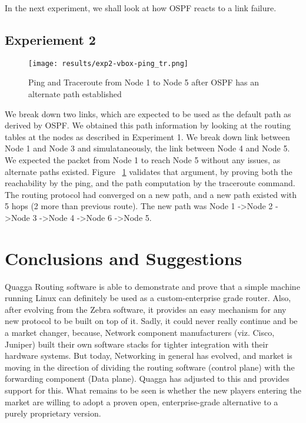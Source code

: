 \documentclass{article}
\begin{document}
In the next experiment, we shall look at how OSPF reacts to a link failure.\\
\subsection{Experiement 2}
\begin{figure}[ht!]
  \centering
  \texttt{[image: results/exp2-vbox-ping\_tr.png]}
  \caption{Ping and Traceroute from Node 1 to Node 5 after OSPF has an alternate path established}
  \label{fig:exp2-vbox-ping_tr}
\end{figure}
We break down two links, which are expected to be used as the default path as derived by OSPF.
We obtained this path information by looking at the routing tables at the nodes as described in 
Experiment 1. We break down link between Node 1 and Node 3 and simulataneously, the link between 
Node 4 and Node 5. We expected the packet from Node 1 to reach Node 5 without any issues, as 
alternate paths existed. Figure~ \ref{fig:exp2-vbox-ping_tr} validates that argument, by proving
both the reachability by the ping, and the path computation by the traceroute command.
The routing protocol had converged on a new path, and a new path existed with 5 hops (2 more than
previous route). The new path was Node 1 -\textgreater  Node 2 -\textgreater Node 3 -\textgreater Node 4 -\textgreater Node 6 -\textgreater Node 5.\\


\clearpage
\section{Conclusions and Suggestions}
Quagga Routing software is able to demonstrate and prove that a simple machine running 
Linux can definitely be used as a custom-enterprise grade router. Also, after evolving 
from the Zebra software, it provides an easy mechanism for any new protocol to be built 
on top of it. Sadly, it could never really continue and be a market changer, because, 
Network component manufacturers (viz. Cisco, Juniper) built their own software stacks for 
tighter integration with their hardware systems. But today, Networking in general has 
evolved, and market is moving in the direction of dividing the routing software (control plane) 
with the forwarding component (Data plane). Quagga has adjusted to this and provides 
support for this. What remains to be seen is whether the new players entering the market 
are willing to adopt a proven open, enterprise-grade alternative to a purely proprietary version.
\clearpage
%
%
\end{document}
